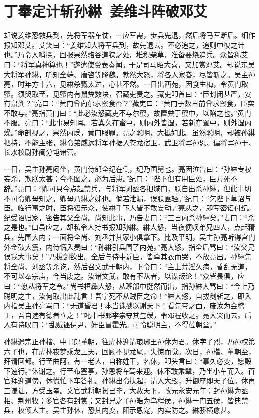 \chapter{丁奉定计斩孙綝~姜维斗阵破邓艾}

却说姜维恐救兵到，先将军器车仗，一应军需，步兵先退，然后将马军断后。细作报知邓艾。艾笑曰：“姜维知大将军兵到，故先退去。不必追之，追则中彼之计也。”乃令人哨探，回报果然骆谷道狭之处，堆积柴草，准备要烧追兵。众皆称艾曰：“将军真神算也！”遂遣使赍表奏闻。于是司马昭大喜，又加赏邓艾。却说东吴大将军孙綝，听知全端、唐咨等降魏，勃然大怒，将各人家眷，尽皆斩之。吴主孙亮，时年方十六，见綝杀戮太过，心甚不然。一日出西苑，因食生梅，令黄门取蜜。须臾取至，见蜜内有鼠粪数块，召藏吏责之。藏吏叩首曰：“臣封闭甚严，安有鼠粪？”亮曰：“黄门曾向尔求蜜食否？”藏吏曰：“黄门于数日前曾求蜜食，臣实不敢与。”亮指黄门曰：“此必汝怒藏吏不与尔蜜，故置粪于蜜中，以陷之也。”黄门不服。亮曰：“此事易知耳。若粪久在蜜中，则内外皆湿，若新在蜜中，则外湿内燥。”命剖视之，果然内燥，黄门服罪。亮之聪明，大抵如此。虽然聪明，却被孙綝把持，不能主张，綝令弟威远将军孙据入苍龙宿卫，武卫将军孙恩、偏将军孙干、长水校尉孙闿分屯诸营。

一日，吴主孙亮闷坐，黄门侍郎全纪在侧，纪乃国舅也。亮因泣告曰：“孙綝专权妄杀，欺朕太甚；今不图之，必为后患。”纪曰：“陛下但有用臣处，臣万死不辞。”亮曰：“卿可只今点起禁兵，与将军刘丞各把城门，朕自出杀孙綝。但此事切不可令卿母知之，卿母乃綝之姊也。倘若泄漏，误朕匪轻。”纪曰：“乞陛下草诏与臣。临行事之时，臣将诏示众，使綝手下人皆不敢妄动。”亮从之，即写密诏付纪。纪受诏归家，密告其父全尚。尚知此事，乃告妻曰：“三日内杀孙綝矣。”妻曰：“杀之是也。”口虽应之，却私令人持书报知孙綝。綝大怒，当夜便唤弟兄四人，点起精兵，先围大内；一面将全尚、刘丞并其家小俱拿下。比及平明，吴主孙亮听得宫门外金鼓大震，内侍慌入奏曰：“孙綝引兵围了内苑。”亮大怒，指全后骂曰：“汝父兄误我大事矣！”乃拔剑欲出。全后与侍中近臣，皆牵其衣而哭，不放亮出。孙綝先将全尚、刘丞等杀讫，然后召文武于朝内，下令曰：“主上荒淫久病，昏乱无道，不可以奉宗庙，今当废之。汝诸文武，敢有不从者，以谋叛论！”众皆畏俱，应曰：“愿从将军之令。”尚书桓彝大怒，从班部中挺然而出，指孙綝大骂曰：“今上乃聪明之主，汝何取出此乱言！吾宁死不从贼臣之命！”綝大怒，自拔剑斩之，即入内指吴主孙亮骂曰：“无道昏君！本当诛戮以谢天下！看先帝之面，废汝为会稽王，吾自选有德者立之！”叱中书郎李崇夺其玺绶，令邓程收之。亮大哭而去。后人有诗叹曰：“乱贼诬伊尹，奸臣冒霍光。可怜聪明主，不得莅朝堂。”

孙綝遣宗正孙楷、中书郎董朝，往虎林迎请琅琊王孙休为君。休字子烈，乃孙权第六子也，在虎林夜梦乘龙上天，回顾不见龙尾，失惊而觉。次日，孙楷、董朝至，拜请回都。行至曲阿，有一老人，自称姓干，名休，叩头言曰：“事久必变，愿殿下速行。”休谢之。行至布塞亭，孙恩将车驾来迎。休不敢乘辇，乃坐小车而入。百官拜迎道傍，休慌忙下车答礼。孙綝出令扶起，请入大殿，升御座即天子位。休再三谦让，方受玉玺。文官武将朝贺已毕，大赦天下，改元永安元年；封孙綝为丞相、荆州牧；多官各有封赏；又封兄之子孙皓为乌程侯。孙綝一门五侯，皆典禁兵，权倾人主。吴主孙休，恐其内变，阳示恩宠，内实防之。綝骄横愈甚。

